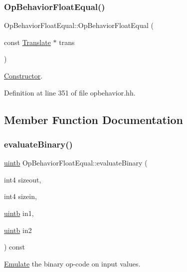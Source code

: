 \subsubsection{\texorpdfstring{OpBehaviorFloatEqual()}{OpBehaviorFloatEqual()}}
{\footnotesize\ttfamily Op\+Behavior\+Float\+Equal\+::\+Op\+Behavior\+Float\+Equal (\begin{DoxyParamCaption}\item[{const \mbox{\hyperlink{class_translate}{Translate}} $\ast$}]{trans }\end{DoxyParamCaption})\hspace{0.3cm}{\ttfamily [inline]}}



\mbox{\hyperlink{class_constructor}{Constructor}}. 



Definition at line 351 of file opbehavior.\+hh.



\subsection{Member Function Documentation}
\mbox{\label{class_op_behavior_float_equal_a108413ce9077413fd528e214c4d0a6b5}} 
\subsubsection{\texorpdfstring{evaluateBinary()}{evaluateBinary()}}
{\footnotesize\ttfamily \mbox{\hyperlink{types_8h_a2db313c5d32a12b01d26ac9b3bca178f}{uintb}} Op\+Behavior\+Float\+Equal\+::evaluate\+Binary (\begin{DoxyParamCaption}\item[{int4}]{sizeout,  }\item[{int4}]{sizein,  }\item[{\mbox{\hyperlink{types_8h_a2db313c5d32a12b01d26ac9b3bca178f}{uintb}}}]{in1,  }\item[{\mbox{\hyperlink{types_8h_a2db313c5d32a12b01d26ac9b3bca178f}{uintb}}}]{in2 }\end{DoxyParamCaption}) const\hspace{0.3cm}{\ttfamily [virtual]}}



\mbox{\hyperlink{class_emulate}{Emulate}} the binary op-\/code on input values. 


